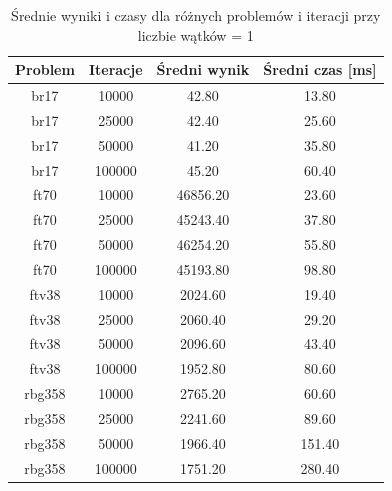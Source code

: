 \begin{table}[h]
\centering
\begin{tabular}{|c|c|c|c|}
\hline
\textbf{Problem} & \textbf{Iteracje} & \textbf{Średni wynik} & \textbf{Średni czas [ms]} \\
\hline
br17 & 10000 & 42.80 & 13.80 \\
br17 & 25000 & 42.40 & 25.60 \\
br17 & 50000 & 41.20 & 35.80 \\
br17 & 100000 & 45.20 & 60.40 \\
\hline
ft70 & 10000 & 46856.20 & 23.60 \\
ft70 & 25000 & 45243.40 & 37.80 \\
ft70 & 50000 & 46254.20 & 55.80 \\
ft70 & 100000 & 45193.80 & 98.80 \\
\hline
ftv38 & 10000 & 2024.60 & 19.40 \\
ftv38 & 25000 & 2060.40 & 29.20 \\
ftv38 & 50000 & 2096.60 & 43.40 \\
ftv38 & 100000 & 1952.80 & 80.60 \\
\hline
rbg358 & 10000 & 2765.20 & 60.60 \\
rbg358 & 25000 & 2241.60 & 89.60 \\
rbg358 & 50000 & 1966.40 & 151.40 \\
rbg358 & 100000 & 1751.20 & 280.40 \\
\hline
\end{tabular}
\caption{Średnie wyniki i czasy dla różnych problemów i iteracji przy liczbie wątków = 1}
\label{tab:srednie_wyniki_{threads}}
\end{table}
